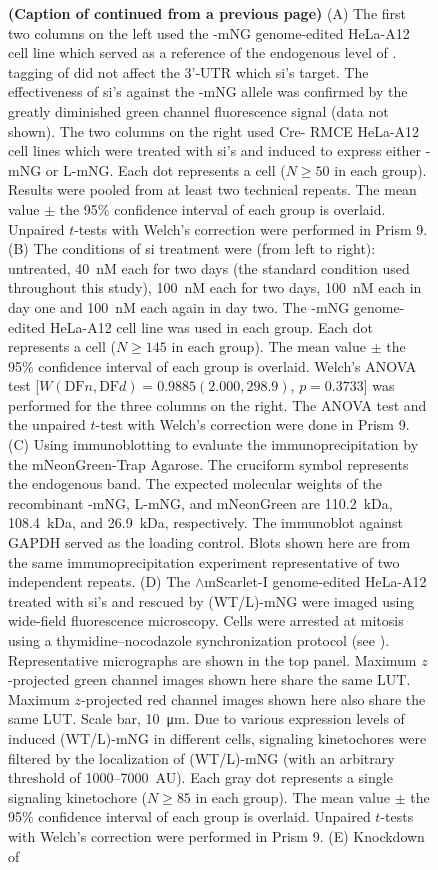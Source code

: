 \begin{figure}
    \noindent\justifying \textbf{(Caption of  continued from a previous page)} (A) The first two columns on the left used the -mNG genome-edited HeLa-A12 cell line which served as a reference of the endogenous level of .  tagging of  did not affect the 3'-UTR which si's target. The effectiveness of si's against the -mNG allele was confirmed by the greatly diminished green channel fluorescence signal (data not shown). The two columns on the right used Cre- RMCE HeLa-A12 cell lines which were treated with si's and induced to express either -mNG or \textDelta{}L-mNG. Each dot represents a cell ($N \geq 50$ in each group). Results were pooled from at least two technical repeats. The mean value $\pm$ the 95\% confidence interval of each group is overlaid. Unpaired $t$-tests with Welch's correction were performed in Prism 9. (B) The conditions of si treatment were (from left to right): untreated, \SI{40}{nM} each for two days (the standard condition used throughout this study), \SI{100}{nM} each for two days, \SI{100}{nM} each in day one and \SI{100}{nM} each again in day two. The -mNG genome-edited HeLa-A12 cell line was used in each group. Each dot represents a cell ($N \geq 145$ in each group). The mean value $\pm$ the 95\% confidence interval of each group is overlaid. Welch's ANOVA test [$W(\text{DF}n, \text{DF}d) = 0.9885 (2.000, 298.9)$, $p = 0.3733$] was performed for the three columns on the right. The ANOVA test and the unpaired $t$-test with Welch's correction were done in Prism 9. (C) Using immunoblotting to evaluate the immunoprecipitation by the mNeonGreen-Trap Agarose. The cruciform symbol represents the endogenous  band. The expected molecular weights of the recombinant -mNG, \textDelta{}L-mNG, and mNeonGreen are \SI{110.2}{kDa}, \SI{108.4}{kDa}, and \SI{26.9}{kDa}, respectively. The immunoblot against GAPDH served as the loading control. Blots shown here are from the same immunoprecipitation experiment representative of two independent repeats. (D) The $\wedge$mScarlet-I genome-edited HeLa-A12 treated with si's and rescued by (WT/\textDelta{}L)-mNG were imaged using wide-field fluorescence microscopy. Cells were arrested at mitosis using a thymidine--nocodazole synchronization protocol (see ). Representative micrographs are shown in the top panel. Maximum $z$-projected green channel images shown here share the same LUT. Maximum $z$-projected red channel images shown here also share the same LUT. Scale bar, \SI{10}{\micro m}. Due to various expression levels of induced (WT/\textDelta{}L)-mNG in different cells, signaling kinetochores were filtered by the localization of (WT/\textDelta{}L)-mNG (with an arbitrary threshold of 1000--\SI{7000}{AU}). Each gray dot represents a single signaling kinetochore ($N \geq 85$ in each group). The mean value $\pm$ the 95\% confidence interval of each group is overlaid. Unpaired $t$-tests with Welch's correction were performed in Prism 9. (E) Knockdown of 
\end{figure}
